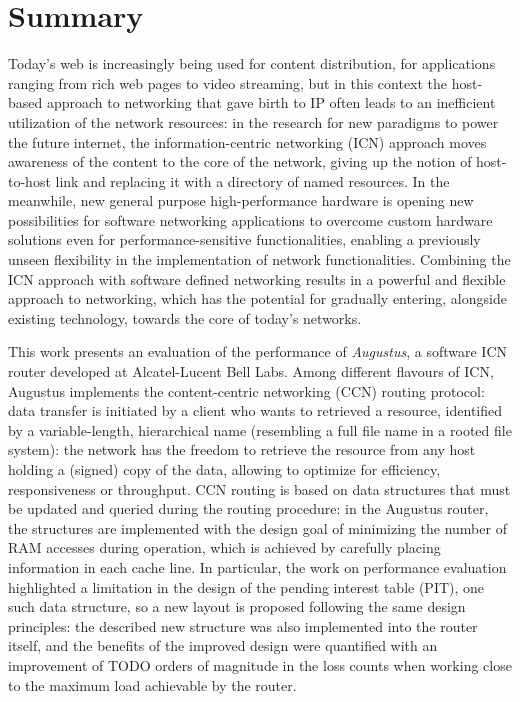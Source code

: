 \documentclass[11pt,a4paper,twoside,titlepage,openany]{book}
\begin{document}

\chapter*{Summary}

Today's web is increasingly being used for content distribution, for applications ranging from rich web pages to video streaming, but in this context the host-based approach to networking that gave birth to IP often leads to an inefficient utilization of the network resources: in the research for new paradigms to power the future internet, the information-centric networking (ICN) approach moves awareness of the content to the core of the network, giving up the notion of host-to-host link and replacing it with a directory of named resources.
In the meanwhile, new general purpose high-performance hardware is opening new possibilities for software networking applications to overcome custom hardware solutions even for performance-sensitive functionalities, enabling a previously unseen flexibility in the implementation of network functionalities.
Combining the ICN approach with software defined networking results in a powerful and flexible approach to networking, which has the potential for gradually entering, alongside existing technology, towards the core of today's networks.

This work presents an evaluation of the performance of \emph{Augustus}, a software ICN router developed at Alcatel-Lucent Bell Labs. Among different flavours of ICN, Augustus implements the content-centric networking (CCN) routing protocol: data transfer is initiated by a client who wants to retrieved a resource, identified by a variable-length, hierarchical name (resembling a full file name in a rooted file system): the network has the freedom to retrieve the resource from any host holding a (signed) copy of the data, allowing to optimize for efficiency, responsiveness or throughput. CCN routing is based on data structures that must be updated and queried during the routing procedure: in the Augustus router, the structures are implemented with the design goal of minimizing the number of RAM accesses during operation, which is achieved by carefully placing information in each cache line. In particular, the work on performance evaluation highlighted a limitation in the design of the pending interest table (PIT), one such data structure, so a new layout is proposed following the same design principles: the described new structure was also implemented into the router itself, and the benefits of the improved design were quantified with an improvement of TODO  orders of magnitude in the loss counts when working close to the maximum load achievable by the router.
\end{document}
